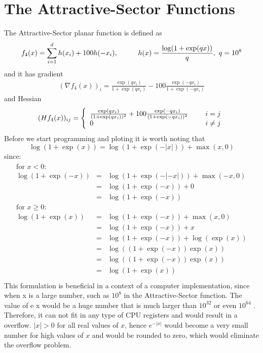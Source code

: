 \documentclass[a4paper]{article}
\begin{document}
\section{The Attractive-Sector Functions}
The Attractive-Sector planar function is defined as
\begin{align*}
  f_4(x) = \sum_{i=1}^d h(x_i) + 100h(-x_i), \hspace*{10mm} h(x) = \frac{\log(1+\exp(qx))}{q},\ q=10^8
\end{align*}
and it has gradient
\begin{align*}
  (\nabla f_4(x))_i = \frac{\exp(qx_i)}{1+\exp(qx_i)}-100\frac{\exp(-qx_i)}{1+\exp(-qx_i)}
\end{align*}
and Hessian
\begin{align*}
  (Hf_4(x))_{ij} =
    \left\{
  \begin{array}{ll}
    \frac{\exp(qx_i)}{(1+\exp(qx_i))^2}+100\frac{\exp(-qx_i)}{(1+\exp(-qx_i))^2} \hspace*{5mm}  & i=j\\
    0                                     & i\neq j
  \end{array}
  \right.
\end{align*}
Before we start programming and ploting it is worth noting that
\[
\log(1+\exp(x)) = \log(1+\exp(-|x|))+\max(x,0)
\]
since:
\begin{align*}
  \begin{array}{lcl}
    \text{for } x<0:\\
    \log(1+\exp(-x)) &=& \log(1+\exp(-|-x|))+\max(-x,0)\\
    &=& \log(1+\exp(-x))+0\\
    &=& \log(1+\exp(-x))\\
    \text{for } x\geq 0:\\
    \log(1+\exp(x)) &=& \log(1+\exp(-x))+\max(x,0)\\
    &=& \log(1+\exp(-x))+x\\
    &=& \log(1+\exp(-x))+\log(\exp(x))\\
    &=& \log((1+\exp(-x))\exp(x))\\
    &=& \log((1+\exp(-x))\exp(x))\\
    &=& \log(1+\exp(x))\\
  \end{array}
\end{align*}
This formulation is beneficial in a context of a computer implementation, since when x is a large
number, such as $10^8$ in the Attractive-Sector function. The value of e x would be a huge number
that is much larger than $10^{32}$ or even $10^{64}$ . Therefore, it can not fit in any type of CPU registers
and would result in a overflow. $|x|> 0$ for all real values of $x$, hence $e^{-|x|}$ would become a
very small number for high values of $x$ and would be rounded to zero, which would eliminate the
overflow problem.
\end{document}
